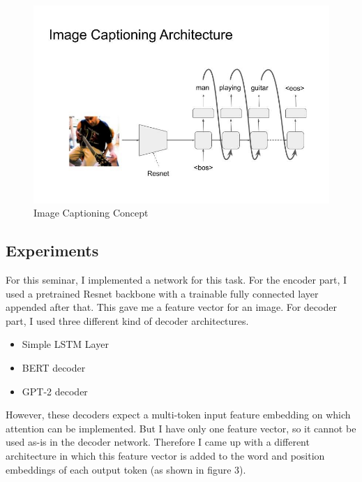 \documentclass[]{krantz}
\providecommand{\tightlist}{%
  \setlength{\itemsep}{0pt}\setlength{\parskip}{0pt}}
\begin{document}
\begin{figure}
\centering
\includegraphics{figures/04-01-use-case1/caption_concept.jpg}
\caption{Image Captioning Concept}
\end{figure}

\hypertarget{experiments}{%
\subsection{Experiments}\label{experiments}}

For this seminar, I implemented a network for this task. For the encoder part, I used a pretrained Resnet backbone with a trainable fully connected layer appended after that. This gave me a feature vector for an image. For decoder part, I used three different kind of decoder architectures.

\begin{itemize}
\tightlist
\item
  Simple LSTM Layer
\item
  BERT decoder
\item
  GPT-2 decoder
\end{itemize}

However, these decoders expect a multi-token input feature embedding on which attention can be implemented. But I have only one feature vector, so it cannot be used as-is in the decoder network. Therefore I came up with a different architecture in which this feature vector is added to the word and position embeddings of each output token (as shown in figure 3).
\end{document}
